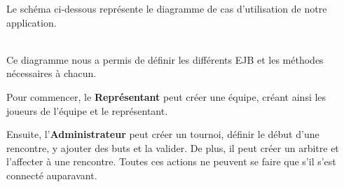 \documentclass[10pt]{report}
\begin{document}
Le schéma ci-dessous représente le diagramme de cas d'utilisation de notre application.
	\begin{figure}[hp]
	      \begin{center}
	      \end{center}
	\end{figure}
\\

Ce diagramme nous a permis de définir les différents EJB et les méthodes nécessaires à chacun.

Pour commencer, le \textbf{Représentant} peut créer une équipe, créant ainsi les joueurs de l'équipe et le représentant.

Ensuite, l'\textbf{Administrateur} peut créer un tournoi, définir le début d'une rencontre, y ajouter des buts et la valider.
De plus, il peut créer un arbitre et l'affecter à une rencontre.
Toutes ces actions ne peuvent se faire que s'il s'est connecté auparavant.
\end{document}
